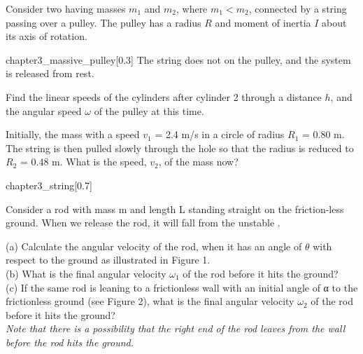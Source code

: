 \begin{example}
    Consider two  having masses $m_1$
    and $m_2$, where $m_1 < m_2$, connected by a
    string passing over a pulley. The pulley
    has a radius $R$ and moment of inertia $I$
    about its axis of rotation.
    \begin{singlefigure}{chapter3_massive_pulley}[0.3]
        The string does
        not  on the pulley, and the system
        is released from rest.
    \end{singlefigure}
    Find the linear
    speeds of the cylinders after
    cylinder 2  through a
    distance $h$, and the angular
    speed $\omega$ of the pulley at this time.
\end{example}
\begin{example}
    Initially, the mass  with a speed $v_1$ = 2.4 m/s in
    a circle of radius $R_1$ = 0.80 m.
    The string is then pulled slowly through the hole so
    that the radius is reduced to $R_2$ = 0.48 m. What is the
    speed, $v_2$, of the mass now?
    \begin{singlefigure}{chapter3_string}[0.7]
    \end{singlefigure}
\end{example}
\begin{example}
    Consider a rod with mass m and length L standing straight on the friction-less ground. When we
    release the rod, it will fall from the unstable .
    \begin{center}
        \quad
    \end{center}
    (a) Calculate the angular velocity of the rod, when it has an angle of $\theta$ with respect to the ground
    as illustrated in Figure 1.\\
    (b) What is the final angular velocity $\omega_1$ of the rod before it hits the ground?\\
    (c) If the same rod is leaning to a frictionless wall with an initial angle of α to the frictionless
    ground (see Figure 2), what is the final angular velocity $\omega_2$ of the rod before it hits the ground?\\
    {\em Note that there is a possibility that the right end of the rod leaves from the wall before the rod hits the ground.}
\end{example}